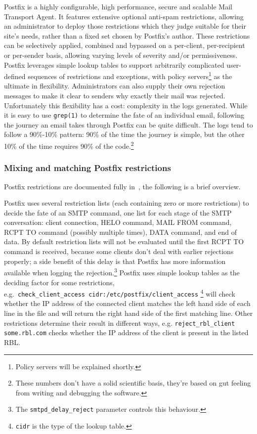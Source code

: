 \documentclass[a4paper,12pt,draft]{article}
\begin{document}
Postfix is a highly configurable, high performance, secure and scalable
Mail Transport Agent.  It features extensive optional anti-spam
restrictions, allowing an administrator to deploy those restrictions which
they judge suitable for their site's needs, rather than a fixed set chosen
by Postfix's author.  These restrictions can be selectively applied,
combined and bypassed on a per-client, per-recipient or per-sender basis,
allowing varying levels of severity and/or permissiveness.  Postfix
leverages simple lookup tables to support arbitrarily complicated
user-defined sequences of restrictions and exceptions, with policy
servers\footnote{Policy servers will be explained shortly.} as the ultimate
in flexibility.  Administrators can also supply their own rejection
messages to make it clear to senders why exactly their mail was rejected.
Unfortunately this flexibility has a cost: complexity in the logs
generated.  While it is easy to use \texttt{grep(1)} to determine the fate
of an individual email, following the journey an email takes through
Postfix can be quite difficult.  The logs tend to follow a 90\%-10\%
pattern: 90\% of the time the journey is simple, but the other 10\% of the
time requires 90\% of the code.\footnote{These numbers don't have a solid
scientific basis, they're based on gut feeling from writing and debugging
the software.}

\subsubsection{Mixing and matching Postfix restrictions}

Postfix restrictions are documented fully in~\cite{smtpd_access_readme,
smtpd_per_user_control, policy-servers}, the following is a brief overview.

Postfix uses several restriction lists (each containing zero or more
restrictions) to decide the fate of an SMTP command, one list for each
stage of the SMTP conversation: client connection, HELO command, MAIL FROM
command, RCPT TO command (possibly multiple times), DATA command, and end
of data.  By default restriction lists will not be evaluated until the
first RCPT TO command is received, because some clients don't deal with
earlier rejections properly; a side benefit of this delay is that Postfix
has more information available when logging the rejection.\footnote{The
\texttt{smtpd\_delay\_reject} parameter controls this behaviour.}  Postfix
uses simple lookup tables as the deciding factor for some restrictions,
e.g.\ \texttt{check\_client\_access~cidr:/etc/postfix/client\_access}
\footnote{\texttt{cidr} is the type of the lookup table.} will check
whether the IP address of the connected client matches the left hand side
of each line in the file and will return the right hand side of the first
matching line.  Other restrictions determine their result in different
ways, e.g. \texttt{reject\_rbl\_client some.rbl.com} checks whether the IP
address of the client is present in the listed RBL\@.
\end{document}
